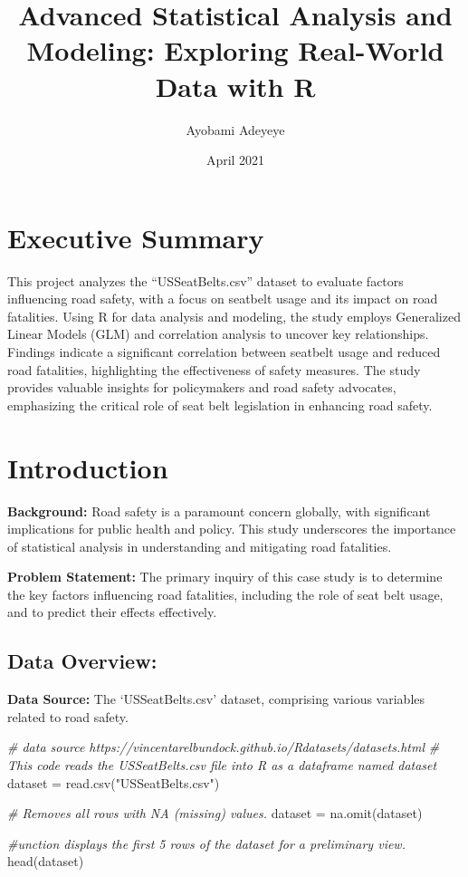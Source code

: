 \documentclass[
]{article}
\title{Advanced Statistical Analysis and Modeling: Exploring Real-World
Data with R}
\author{Ayobami Adeyeye}
\date{April 2021}
\newenvironment{Shaded}{\begin{snugshade}}{\end{snugshade}}
\newcommand{\CommentTok}[1]{\textcolor[rgb]{0.56,0.35,0.01}{\textit{#1}}}
\newcommand{\FunctionTok}[1]{\textcolor[rgb]{0.00,0.00,0.00}{#1}}
\newcommand{\NormalTok}[1]{#1}
\newcommand{\OtherTok}[1]{\textcolor[rgb]{0.56,0.35,0.01}{#1}}
\newcommand{\StringTok}[1]{\textcolor[rgb]{0.31,0.60,0.02}{#1}}
\begin{document}
\maketitle

\hypertarget{executive-summary}{%
\section{Executive Summary}\label{executive-summary}}

This project analyzes the ``USSeatBelts.csv'' dataset to evaluate
factors influencing road safety, with a focus on seatbelt usage and its
impact on road fatalities. Using R for data analysis and modeling, the
study employs Generalized Linear Models (GLM) and correlation analysis
to uncover key relationships. Findings indicate a significant
correlation between seatbelt usage and reduced road fatalities,
highlighting the effectiveness of safety measures. The study provides
valuable insights for policymakers and road safety advocates,
emphasizing the critical role of seat belt legislation in enhancing road
safety.

\hypertarget{introduction}{%
\section{Introduction}\label{introduction}}

\textbf{Background:} Road safety is a paramount concern globally, with
significant implications for public health and policy. This study
underscores the importance of statistical analysis in understanding and
mitigating road fatalities.

\textbf{Problem Statement:} The primary inquiry of this case study is to
determine the key factors influencing road fatalities, including the
role of seat belt usage, and to predict their effects effectively.

\hypertarget{data-overview}{%
\subsection{Data Overview:}\label{data-overview}}

\textbf{Data Source:} The `USSeatBelts.csv' dataset, comprising various
variables related to road safety.

\begin{Shaded}
\begin{Highlighting}[]
\CommentTok{\# data source https://vincentarelbundock.github.io/Rdatasets/datasets.html}
\CommentTok{\# This code reads the \textquotesingle{}USSeatBelts.csv\textquotesingle{} file into R as a dataframe named \textquotesingle{}dataset\textquotesingle{}}
\NormalTok{dataset }\OtherTok{=} \FunctionTok{read.csv}\NormalTok{(}\StringTok{"USSeatBelts.csv"}\NormalTok{)}

\CommentTok{\# Removes all rows with NA (missing) values.}
\NormalTok{dataset }\OtherTok{=} \FunctionTok{na.omit}\NormalTok{(dataset)}

\CommentTok{\#unction displays the first 5 rows of the dataset for a preliminary view.}
\FunctionTok{head}\NormalTok{(dataset)}
\end{Highlighting}
\end{Shaded}
\end{document}
